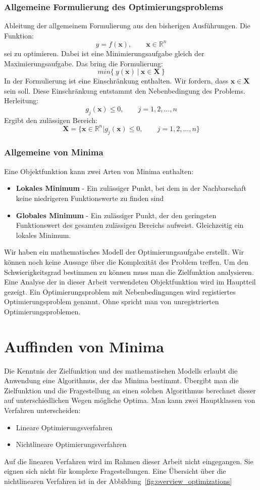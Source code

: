 \subsubsection{Allgemeine Formulierung des Optimierungsproblems}
%
Ableitung der allgemeinem Formulierung aus den bisherigen Ausführungen. Die Funktion:
$$
y=f(\mathbf{x}), \qquad \mathbf{x}\in\mathbb{R}^n
$$
sei zu optimieren. Dabei ist eine Minimierungsaufgabe gleich der Maximierungsaufgabe. Das bring die Formulierung:
%
\begin{equation}
\label{eq:optimazion1}
min\{~y(\mathbf{x})~|~\mathbf{x}\in\mathbf{X}~\}
\end{equation}
%
In der Formulierung ist eine Einschränkung enthalten. Wir fordern, dass $\mathbf{x}\in\mathbf{X}$ sein soll. Diese Einschränkung entstammt den Nebenbedingung des Problems. Herleitung:
$$
g_j(\mathbf{x})\leq 0, \qquad j=1,2,...,n
$$
Ergibt den zulässigen Bereich:
$$
\mathbf{X}=\{\mathbf{x}\in \mathbb{R}^n | g_j(\mathbf{x})\leq 0, \qquad j=1,2,...,n\}
$$
%
\subsubsection{Allgemeine von Minima}
%
Eine Objektfunktion kann zwei Arten von Minima enthalten:
\begin{itemize}[itemsep=1mm]
\item \textbf{Lokales Minimum} - Ein zulässiger Punkt, bei dem in der Nachbarschaft keine niedrigeren Funktionswerte zu finden sind
\item \textbf{Globales Minimum} - Ein zulässiger Punkt, der den geringsten Funktionswert des gesamten zulässigen Bereichs aufweist. Gleichzeitig ein lokales Minimum.
\end{itemize}
%
Wir haben ein mathematisches Modell der Optimierungsaufgabe erstellt. Wir können noch keine Aussage über die Komplexität des Problem treffen. Um den Schwierigkeitsgrad bestimmen zu können muss man die Zielfunktion analysieren. Eine Analyse der in dieser Arbeit verwendeten Objektfunktion wird im Hauptteil gezeigt. Ein Optimierungsproblem mit Nebenbedingungen wird registiertes Optimierungsproblem genannt. Ohne spricht man von unregistrierten Optimierungsproblemen.
%
\section{Auffinden von Minima}
%
Die Kenntnis der Zielfunktion und des mathematischen Modells erlaubt die Anwendung eine Algorithmus, der das Minima bestimmt. Übergibt man die Zielfunktion und die Fragestellung an einen solchen Algorithmus berechnet dieser auf unterschiedlichen Wegen mögliche Optima. Man kann zwei Hauptklassen von Verfahren unterscheiden:
%
\begin{itemize}
\item Lineare Optimierungsverfahren
\item Nichtlineare Optimierungsverfahren
\end{itemize}
%
Auf die linearen Verfahren wird im Rahmen dieser Arbeit nicht eingegangen. Sie eignen sich nicht für komplexe Fragestellungen. Eine Übersicht über die nichtlinearen Verfahren ist in der Abbildung~\ref{fig:overview_optimizations}
%
